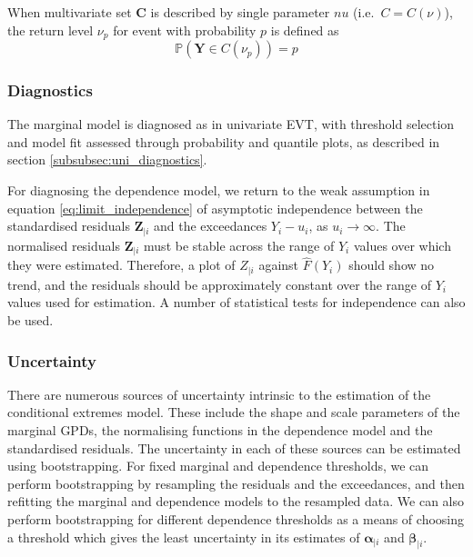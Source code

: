 \documentclass{article}
\numberwithin{equation}{section}
\begin{document}

When multivariate set $\bm{C}$ is described by single parameter $nu$ (i.e.\ $C = C(\nu)$), the return level $\nu_p$ for event with probability $p$ is defined as 
\[
  \mathbb{P}(\bm{Y} \in C(\nu_p)) = p
\]


\subsubsection{Diagnostics} \label{subsubsec:ce_diagnostics}


The marginal model is diagnosed as in univariate EVT, with threshold selection and model fit assessed through probability and quantile plots, as described in section \ref{subsubsec:uni_diagnostics}.

For diagnosing the dependence model, we return to the weak assumption in equation \ref{eq:limit_independence} of asymptotic independence between the standardised residuals $\bm{Z}_{\mid i}$ and the exceedances $Y_i - u_i$, as $u_i \to \infty$.
The normalised residuals $\bm{Z}_{\mid i}$ must be stable across the range of $Y_i$ values over which they were estimated. 
Therefore, a plot of $Z_{\mid i}$ against $\hat{F}(Y_i)$ should show no trend, and the residuals should be approximately constant over the range of $Y_i$ values used for estimation.
A number of statistical tests for independence can also be used. 


\subsubsection{Uncertainty} \label{subsubsec:ce_uncertainty}

There are numerous sources of uncertainty intrinsic to the estimation of the conditional extremes model.
These include the shape and scale parameters of the marginal GPDs, the normalising functions in the dependence model and the standardised residuals. 
The uncertainty in each of these sources can be estimated using bootstrapping.
For fixed marginal and dependence thresholds, we can perform bootstrapping by resampling the residuals and the exceedances, and then refitting the marginal and dependence models to the resampled data.
We can also perform bootstrapping for different dependence thresholds as a means of choosing a threshold which gives the least uncertainty in its estimates of $\bm{\alpha}_{\mid i}$ and $\bm{\beta}_{\mid i}$.
\end{document}
